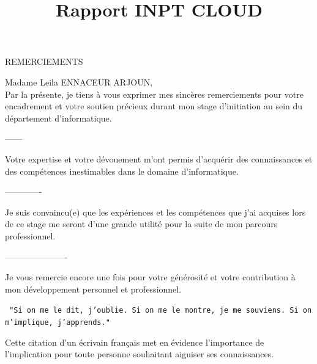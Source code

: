 \documentclass[12pt]{rapportINPTCLOUD}
\title{Rapport INPT CLOUD} %
\begin{document}
	
	
	
	
	
	
	
	\fairemarges %
	\fairepagedegarde %
	\setlength{\baselineskip}{0.35in}
	\newpage
	\begin{center}
		\Huge{ REMERCIEMENTS }
	\end{center}
	\begin{center}
		Madame Leila ENNACEUR  ARJOUN,\\
	
	Par la présente, je tiens à vous exprimer mes sincères remerciements pour votre encadrement et votre soutien précieux durant mon stage d'initiation au sein du département d'informatique.
	
	------
	
	Votre expertise et votre dévouement m'ont permis d'acquérir des connaissances et des compétences inestimables dans le domaine d'informatique. 
	
	-------------
	
	Je suis convaincu(e) que les expériences et les compétences que j'ai acquises lors de ce stage me seront d'une grande utilité pour la suite de mon parcours professionnel.
	
	----------------------
	
	Je vous remercie encore une fois pour votre générosité et votre contribution à mon développement personnel et professionnel.
	
	\end{center}
	
	
	\tabledematieres %
	\listoffigures
	\newpage
\begin{center}
	\texttt{	"Si on me le dit, j’oublie. Si on me le montre, je me souviens. Si on m’implique, j’apprends."}
\end{center}
	
	Cette citation d’un écrivain français met en évidence l’importance de l’implication pour toute personne souhaitant aiguiser ses connaissances.
	
\end{document}
